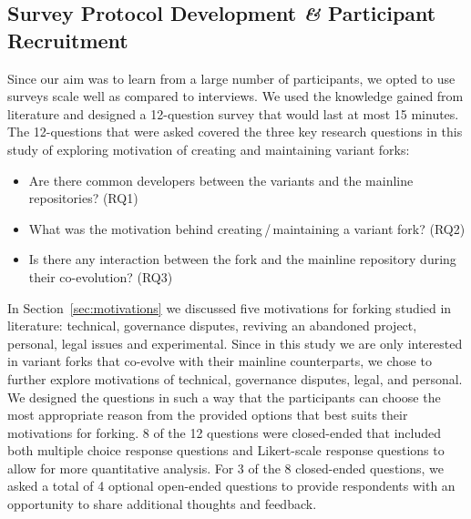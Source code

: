 \subsection{Survey Protocol Development \textit{\&} Participant Recruitment}
\label{sec:protocal}
Since our aim was to learn from a large number of participants, we opted to use surveys scale well as compared to interviews.
We used the knowledge gained from literature and designed a 12-question survey that would last at most 15 minutes. The 12-questions that were asked covered the three key research questions in this study of exploring motivation of creating and maintaining variant forks:

\begin{itemize}
\item Are there common developers between the variants and the mainline repositories? (RQ1)
\item What was the motivation behind creating\,/\,maintaining a variant fork? (RQ2)
\item Is there any interaction between the fork and the mainline repository during their co-evolution? (RQ3)
\end{itemize}

In Section~\ref{sec:motivations} we discussed five motivations for forking studied in literature: technical, governance disputes, reviving an abandoned project, personal, legal issues and experimental. 
Since in this study we are only interested in variant forks that co-evolve with their mainline counterparts, we chose to further explore motivations of technical, governance disputes, legal, and personal. We designed the questions in such a way that the participants can choose the most appropriate reason from the provided options that best suits their motivations for forking. 8 of the 12 questions were closed-ended that included both multiple choice response questions and Likert-scale response questions to allow for more quantitative analysis. For 3 of the 8 closed-ended questions, we asked a total of 4 optional open-ended questions to provide respondents with an opportunity to share additional thoughts and feedback.

